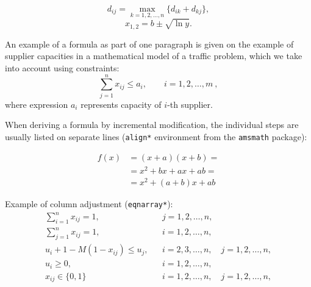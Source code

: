 $$
d_{ij}=\max_{k=1,2,\dots,n} \{d_{ik}+d_{kj}\},
$$
$$
x_{1,2}=b \pm \sqrt{\ln y}.
$$

An example of a formula as part of one paragraph is given on the example of 
supplier capacities in a mathematical model of a traffic problem, which we take 
into account using constraints:
\begin{equation}
\sum_{j=1}^n x_{ij} \le a_i, \qquad i=1,2,\dots,m\ ,
\end{equation}
\noindent
where expression $a_i$ represents capacity of $i$-th supplier.

When deriving a formula by incremental modification, the individual steps are 
usually listed on separate lines (\verb'align*' environment from the \verb|amsmath| package):

\begin{align*}
 f(x) &= (x+a)(x+b) =\\
      &= x^2 + bx + ax + ab =\\
      &= x^2 + (a+b)x + ab
\end{align*}

Example of column adjustment (\verb|eqnarray*|):
\begin{eqnarray*}
\sum_{i=1}^n x_{ij} =1, && j=1,2,\dots,n,\\
\sum_{j=1}^n x_{ij} =1, && i=1,2,\dots,n,\\
u_i + 1 - M(1 - x_{ij}) \le u_j, && i=2,3,\dots,n,\quad j=1,2,\dots,n,\\
u_i \ge 0,              && i=1,2,\dots,n,\\
x_{ij} \in \{0,1\} && i=1,2,\dots,n,\quad j=1,2,\dots,n,\\
\end{eqnarray*}